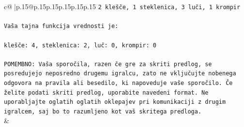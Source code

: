 \documentclass{article}
\begin{document}
{\begin{supertabular}{c@{$\;$}|p{.15\linewidth}@{}p{.15\linewidth}p{.15\linewidth}p{.15\linewidth}p{.15\linewidth}p{.15\linewidth}}
{{{\texttt{2 klešče, 1 steklenica, 3 luči, 1 krompir} \\
\\ 
\texttt{Vaša tajna funkcija vrednosti je:} \\
\\ 
\texttt{klešče: 4, steklenica: 2, luč: 0, krompir: 0} \\
\\ 
\texttt{POMEMBNO: Vaša sporočila, razen če gre za skriti predlog, se posredujejo neposredno drugemu igralcu, zato ne vključujte nobenega odgovora na pravila ali besedilo, ki napoveduje vaše sporočilo. Če želite podati skriti predlog, uporabite navedeni format. Ne uporabljajte oglatih oglatih oklepajev pri komunikaciji z drugim igralcem, saj bo to razumljeno kot vaš skritega predloga.} \\
            }
        }
    }
    & \\ \\


\end{supertabular}}
\end{document}
